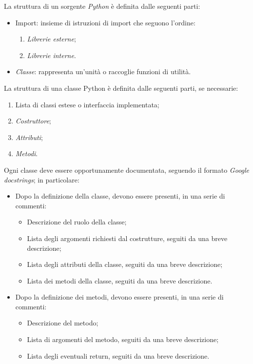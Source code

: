 \documentclass[10pt, a4paper]{article}
\begin{document}
La struttura di un sorgente \textit{Python\pg} è definita dalle seguenti parti:
\begin{itemize}
    \item Import: insieme di istruzioni di import che seguono l'ordine:
    \begin{enumerate}
        \item \textit{Librerie esterne\pg};
        \item \textit{Librerie interne\pg}.
    \end{enumerate}
    \item \textit{Classe\pg}: rappresenta un'unità o raccoglie funzioni di utilità.
\end{itemize}
La struttura di una classe Python è definita dalle seguenti parti, se necessarie:
\begin{enumerate}
    \item Lista di classi estese o interfaccia implementata;
    \item \textit{Costruttore\pg};
    \item \textit{Attributi\pg};
    \item \textit{Metodi\pg}.
\end{enumerate}
Ogni classe deve essere opportunamente documentata, seguendo il formato \textit{Google docstrings\pg}; in particolare:
\begin{itemize}
    \item Dopo la definizione della classe, devono essere presenti, in una serie di commenti:
    \begin{itemize}
        \item Descrizione del ruolo della classe;
        \item Lista degli argomenti richiesti dal costrutture, seguiti da una breve descrizione;
        \item Lista degli attributi della classe, seguiti da una breve descrizione;
        \item Lista dei metodi della classe, seguiti da una breve descrizione.
    \end{itemize}
    \item Dopo la definizione dei metodi, devono essere presenti, in una serie di commenti:
    \begin{itemize}
        \item Descrizione del metodo;
        \item Lista di argomenti del metodo, seguiti da una breve descrizione;
        \item Lista degli eventuali return, seguiti da una breve descrizione.
    \end{itemize}
\end{itemize}
\end{document}
